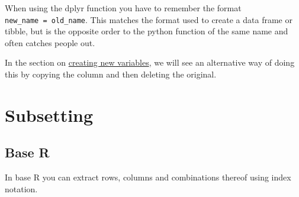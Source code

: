 \documentclass[
  12pt,
]{book}
\begin{document}
When using the dplyr function you have to remember the format \texttt{new\_name\ =\ old\_name}. This matches the format used to create a data frame or tibble, but is the opposite order to the python function of the same name and often catches people out.

In the section on \protect\hyperlink{creating-new-variables}{creating new variables}, we will see an alternative way of doing this by copying the column and then deleting the original.

\hypertarget{subsetting-1}{%
\section{Subsetting}\label{subsetting-1}}

\hypertarget{base-r-1}{%
\subsection{Base R}\label{base-r-1}}

In base R you can extract rows, columns and combinations thereof using index notation.
\end{document}
